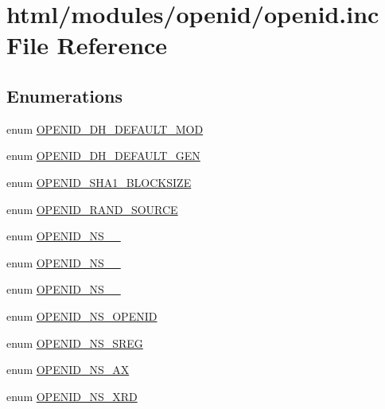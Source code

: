 \hypertarget{openid_8inc}{
\section{html/modules/openid/openid.inc File Reference}
\label{openid_8inc}
}
\subsection*{Enumerations}
\begin{DoxyCompactItemize}
\item 
enum \hyperlink{openid_8inc_a6959f46b7a0a95194027313b08ff9b8f}{OPENID\_\-DH\_\-DEFAULT\_\-MOD} 
\item 
enum \hyperlink{openid_8inc_a37fc6c436be5dbdc8cc896a37bb2ef5b}{OPENID\_\-DH\_\-DEFAULT\_\-GEN} 
\item 
enum \hyperlink{openid_8inc_a6cfc7125130551f147ad67a205750b64}{OPENID\_\-SHA1\_\-BLOCKSIZE} 
\item 
enum \hyperlink{openid_8inc_a231be0589d1284c2e59651c2265bbdd8}{OPENID\_\-RAND\_\-SOURCE} 
\item 
enum \hyperlink{openid_8inc_a397c64482f92c89ab6e7d6e055130403}{OPENID\_\-NS\_\_} 
\item 
enum \hyperlink{openid_8inc_a611ef47dbc81955be33a9257739e491e}{OPENID\_\-NS\_\_} 
\item 
enum \hyperlink{openid_8inc_af6b34e60d425751680d476ff554909b4}{OPENID\_\-NS\_\_} 
\item 
enum \hyperlink{openid_8inc_aea9824c9d4564d018bcf5bf47efd6b15}{OPENID\_\-NS\_\-OPENID} 
\item 
enum \hyperlink{openid_8inc_ab4113c07de00e2981c0710eea146fc89}{OPENID\_\-NS\_\-SREG} 
\item 
enum \hyperlink{openid_8inc_ad145db85315144baf406667a1e7c5959}{OPENID\_\-NS\_\-AX} 
\item 
enum \hyperlink{openid_8inc_a2c33b4d9ba800e52e8b26328fcaea53f}{OPENID\_\-NS\_\-XRD} 
\end{DoxyCompactItemize}
